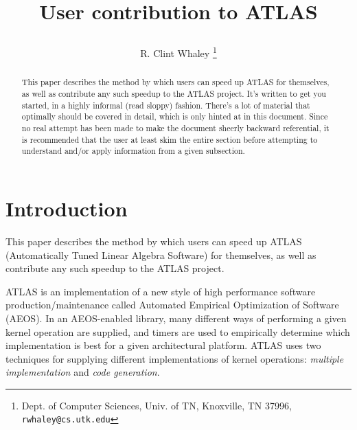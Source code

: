\documentclass[11pt]{article}
\newcommand{\Wskip}[1]{ }
\begin{document}
\begin{titlepage}
\title{User contribution to ATLAS
\Wskip
{
\footnote
{
   This work was supported in part by:
   U.S. Department of Energy under contract number DE-AC05-96OR22464;
   National Science Foundation Science and Technology Center Cooperative
   Agreement No. CCR-8809615;
   University of California, Los Alamos National Laboratory,
   subcontract \# B76680017-3Z;
   Department of Defense Raytheon E-Systems, subcontract\# AA23,
   prime contract\# DAHC94-96-C-0010;
   Department of Defense Nichols Research Corporation,
   subcontract\#s NRC CR-96-0011 (ASC) and prime contract \# DAHC-94-96-C-0005;
   Department of Defense Nichols Research Corporation,
   subcontract\#s NRC CR-96-0011 (CEWES); prime contract \# DAHC-94-96-C-0002
}
}
}
\vspace{.4in}
\author
{
 R. Clint Whaley
 \thanks
 {
  Dept. of Computer Sciences, Univ. of TN,
  Knoxville, TN 37996, {\tt rwhaley@cs.utk.edu}
 }
}
\end{titlepage}
\maketitle

\begin{abstract}
This paper describes the method by which users can speed up ATLAS for
themselves, as well as contribute any such speedup to the ATLAS project.
It's written to get you started, in a highly informal (read sloppy)
fashion.  There's a lot of material that optimally should be covered
in detail, which is only hinted at in this document.  Since no real
attempt has been made to make the document sheerly backward referential,
it is recommended that the user at least skim the entire section before
attempting to understand and/or apply information from a given
subsection.
\end{abstract}

\newpage
\tableofcontents

\newpage

\section{Introduction}

This paper describes the method by which users can speed up ATLAS
(Automatically Tuned Linear Algebra Software) for themselves, as well
as contribute any such speedup to the ATLAS project.

ATLAS is an implementation of a new style of high performance software
production/maintenance called Automated Empirical Optimization of Software
(AEOS).  In an AEOS-enabled library, many different ways of performing
a given kernel operation are supplied, and timers are used to empirically
determine which implementation is best for a given architectural platform.
ATLAS uses two techniques for supplying different implementations of kernel
operations: {\em multiple implementation} and {\em code generation}.
\end{document}
